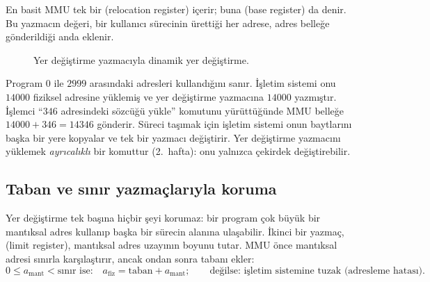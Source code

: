 En basit MMU tek bir  (relocation register) içerir; buna  (base register) da denir. Bu yazmacın değeri, bir kullanıcı sürecinin ürettiği her adrese, adres belleğe gönderildiği anda eklenir.

\begin{figure}[H]
\centering
{}
\caption{Yer değiştirme yazmacıyla dinamik yer değiştirme.}
\end{figure}

Program $0$ ile $2999$ arasındaki adresleri kullandığını sanır. İşletim sistemi onu $14000$ fiziksel adresine yüklemiş ve yer değiştirme yazmacına $14000$ yazmıştır. İşlemci ``$346$ adresindeki sözcüğü yükle'' komutunu yürüttüğünde MMU belleğe $14000 + 346 = 14346$ gönderir. Süreci taşımak için işletim sistemi onun baytlarını başka bir yere kopyalar ve tek bir yazmacı değiştirir. Yer değiştirme yazmacını yüklemek \emph{ayrıcalıklı} bir komuttur (2.~hafta): onu yalnızca çekirdek değiştirebilir.

\subsection{Taban ve sınır yazmaçlarıyla koruma}

Yer değiştirme tek başına hiçbir şeyi korumaz: bir program çok büyük bir mantıksal adres kullanıp başka bir sürecin alanına ulaşabilir. İkinci bir yazmaç,  (limit register), mantıksal adres uzayının boyunu tutar. MMU önce mantıksal adresi sınırla karşılaştırır, ancak ondan sonra tabanı ekler:
\[
0 \le a_{\text{mant}} < \text{sınır ise:}\quad a_{\text{fiz}} = \text{taban} + a_{\text{mant}};
\qquad \text{değilse: işletim sistemine tuzak (adresleme hatası).}
\]

